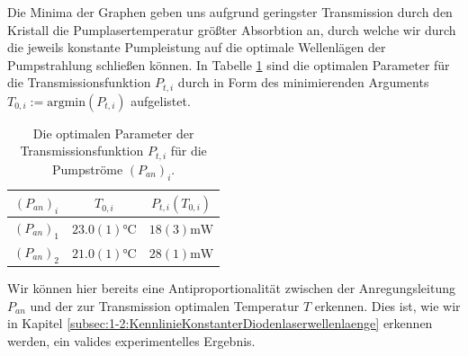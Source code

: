 \documentclass[../../main.tex]{subfiles}
\begin{document}
    Die Minima der Graphen geben uns aufgrund geringster Transmission durch den Kristall die Pumplasertemperatur größter Absorbtion an, durch welche wir durch die jeweils konstante Pumpleistung auf die optimale Wellenlägen der Pumpstrahlung schließen können. In Tabelle \ref{tab:1-1-OptimaleParameterSpektrum} sind die optimalen Parameter für die Transmissionsfunktion $P_{t,i}$ durch in Form des minimierenden Arguments $T_{0,i}:=\text{argmin}(P_{t,i})$ aufgelistet. 
    \begin{table}[H]
        \centering
        \begin{tabular}{c|cc}
            \hline
            $(P_{\textit{an}})_i$ & $T_{0,i}$ & $P_{t,i}(T_{0,i})$ \\
            \hline\hline
            $(P_{\textit{an}})_1$ & $23.0(1)\si{\celsius}$ & $18(3)\si{\mW}$ \\
            $(P_{\textit{an}})_2$ & $21.0(1)\si{\celsius}$ & $28(1)\si{\mW}$ \\
        \end{tabular}
        \caption{Die optimalen Parameter der Transmissionsfunktion $P_{t,i}$ für die Pumpströme $(P_{\textit{an}})_i$.}
        \label{tab:1-1-OptimaleParameterSpektrum}
    \end{table}
    Wir können hier bereits eine Antiproportionalität zwischen der Anregungsleitung $P_{\textit{an}}$ und der zur Transmission optimalen Temperatur $T$ erkennen. Dies ist, wie wir in Kapitel \ref{subsec:1-2:KennlinieKonstanterDiodenlaserwellenlaenge} erkennen werden, ein valides experimentelles Ergebnis.
\end{document}
